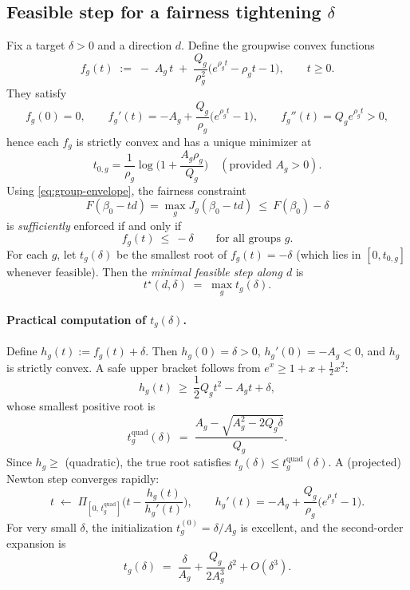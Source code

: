 \documentclass[11pt]{article}
\theoremstyle{plain}
\theoremstyle{definition}
\newcommand{\1}{\mathbf{1}}
\begin{document}
\subsection{Feasible step for a fairness tightening \texorpdfstring{$\delta$}{delta}}
Fix a target $\delta>0$ and a direction $d$. Define the groupwise convex functions
\begin{equation}
\label{eq:fg}
f_g(t)\;:=\;-\;A_g\,t\;+\;\frac{Q_g}{\rho_g^2}\Big(e^{\rho_g t}-\rho_g t -1\Big),\qquad t\ge 0.
\end{equation}
They satisfy
\[
f_g(0)=0,\qquad f_g'(t)=-A_g+\frac{Q_g}{\rho_g}\big(e^{\rho_g t}-1\big),\qquad
f_g''(t)=Q_g e^{\rho_g t}>0,
\]
hence each $f_g$ is strictly convex and has a unique minimizer at
\begin{equation}
\label{eq:t0g}
t_{0,g}=\frac{1}{\rho_g}\log\!\Big(1+\frac{A_g\rho_g}{Q_g}\Big)\quad(\text{provided }A_g>0).
\end{equation}
Using \eqref{eq:group-envelope}, the fairness constraint
\[
F(\beta_0-t d)=\max_g J_g(\beta_0-t d)\ \le\ F(\beta_0)-\delta
\]
is \emph{sufficiently} enforced if and only if
\begin{equation}
\label{eq:all-g-ineq}
f_g(t)\ \le\ -\delta\qquad\text{for all groups }g.
\end{equation}
For each $g$, let $t_g(\delta)$ be the smallest root of $f_g(t)=-\delta$
(which lies in $[0,t_{0,g}]$ whenever feasible). Then the \emph{minimal feasible step along $d$} is
\begin{equation}
\label{eq:tstar}
t^\star(d,\delta)\;=\;\max_{g} t_g(\delta).
\end{equation}

\paragraph{Practical computation of $t_g(\delta)$.}
Define $h_g(t):=f_g(t)+\delta$.
Then $h_g(0)=\delta>0$, $h_g'(0)=-A_g<0$, and $h_g$ is strictly convex.
A safe upper bracket follows from $e^{x}\ge 1+x+\tfrac12 x^2$:
\[
h_g(t)\ \ge\ \frac{1}{2}Q_g t^2 - A_g t + \delta,
\]
whose smallest positive root is
\begin{equation}
\label{eq:tquad}
t^{\text{quad}}_g(\delta)\;=\;\frac{A_g-\sqrt{A_g^2-2Q_g \delta}}{Q_g}.
\end{equation}
Since $h_g\ge$ (quadratic), the true root satisfies $t_g(\delta)\le t^{\text{quad}}_g(\delta)$.
A (projected) Newton step converges rapidly:
\[
t \;\leftarrow\; \Pi_{[0,\,t^{\text{quad}}_g]}\!\Big(t-\frac{h_g(t)}{h_g'(t)}\Big),
\qquad
h_g'(t)= -A_g + \frac{Q_g}{\rho_g}\big(e^{\rho_g t}-1\big).
\]
For very small $\delta$, the initialization $t_g^{(0)}=\delta/A_g$ is excellent, and the second-order expansion is
\begin{equation}
\label{eq:tg-expansion}
t_g(\delta)\;=\;\frac{\delta}{A_g}+\frac{Q_g}{2A_g^3}\,\delta^2 + O(\delta^3).
\end{equation}
\end{document}
